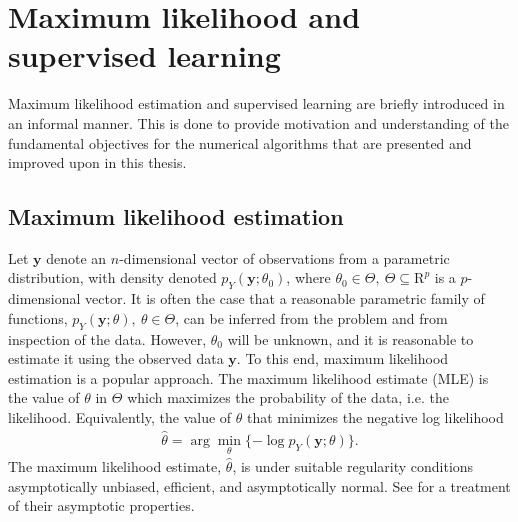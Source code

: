 \chapter{Maximum likelihood and supervised learning}
\label{chap:ml-and-sl}

Maximum likelihood estimation and supervised learning are briefly introduced in an informal manner. %
This is done to provide motivation and understanding of the fundamental objectives for the numerical algorithms that are presented and improved upon in this thesis.


\section{Maximum likelihood estimation}

Let $\mathbf{y}$ denote an $n$-dimensional vector of observations from a parametric distribution, with density denoted $p_Y(\mathbf{y};\theta_0)$, where $\theta_0\in \Theta,~\Theta\subseteq \mathrm{R}^p$ is a $p$-dimensional vector.
It is often the case that a reasonable parametric family of functions, $p_Y(\mathbf{y};\theta),~\theta\in \Theta$, can be inferred from the problem and from inspection of the data.
However, $\theta_0$ will be unknown, and it is reasonable to estimate it using the observed data $\mathbf{y}$.
To this end, maximum likelihood estimation is a popular approach.
The maximum likelihood estimate (MLE) is the value of $\theta$ in $\Theta$ which maximizes the probability of the data, i.e. the likelihood.
Equivalently, the value of $\theta$ that minimizes the negative log likelihood
\begin{align}\label{eq:mle}
	\hat{\theta} = \arg\min_\theta \{-\log p_Y(\mathbf{y};\theta)\}.
\end{align}
The maximum likelihood estimate, $\hat{\theta}$, is under suitable regularity conditions asymptotically unbiased, efficient, and asymptotically normal.
See \citet{vanDerVaart} for a treatment of their asymptotic properties.


